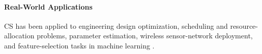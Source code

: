 \paragraph{Real-World Applications}
CS has been applied to engineering design optimization, scheduling and resource-allocation problems, parameter estimation, wireless sensor-network deployment, and feature-selection tasks in machine learning \autocite{YangDeb2014Cuckoo}.

